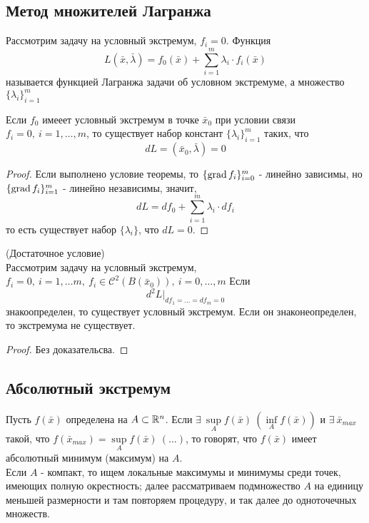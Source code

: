 \subsection{Метод множителей Лагранжа}
\begin{definition}
    Рассмотрим задачу на условный экстремум, $f_i=0$. Функция 
    \[L(\bar{x},\bar{\lambda})=f_0(\bar{x})+\sum\limits_{i=1}^{m}\lambda_i\cdot f_i(\bar{x})\]
    называется функцией Лагранжа задачи об условном экстремуме, а множество $\{\lambda_i\}_{i=1}^m$
\end{definition} 
\begin{theorem}
    Если $f_0$ имееет условный экстремум в точке $\bar{x}_0$ при условии связи $f_i=0,\ i=1,\dots,m$, то существует набор констант $\{\lambda_i\}_{i=1}^m$ таких, что 
    \[dL=(\bar{x}_0,\bar{\lambda})=0\]
\end{theorem} 
\begin{proof}
    Если выполнено условие теоремы, то $\{\operatorname*{grad} f_i\}_{i=0}^m$ - линейно зависимы, но $\{\operatorname*{grad} f_i\}_{i=1}^m$ - линейно независимы, значит,
    \[dL=df_0+\sum\limits_{i=1}^{m}\lambda_i\cdot df_i\]
    то есть существует набор $\{\lambda_i\}$, что $dL=0$. 
\end{proof} 
\begin{theorem} (Достаточное условие)\\
    Рассмотрим задачу на условный экстремум, $f_i=0,\ i=1,\dots m,\ f_i\in \mathcal{C}^2(B(\bar{x}_0)),\ i=0,\dots,m$ Если
    \[d^2L|_{df_1=\dots=df_m=0}\]
    знакоопределен, то существует условный экстремум. Если он знаконеопределен, то экстремума не существует.
\end{theorem} 
\begin{proof}
    Без доказательсва.
\end{proof} 
\subsection{Абсолютный экстремум}
\begin{definition}
    Пусть $f(\bar{x})$ определена на $A\subset \mathbb{R}^n$. Если $\exists\ \sup\limits_A f(\bar{x})\ (\inf\limits_A f(\bar{x}))$ и $\exists\ \bar{x}_{max}$ такой, что $f(\bar{x}_{max})=\sup\limits_A f(\bar{x})\ (\dots)$, то говорят, что $f(\bar{x})$ имеет абсолютный минимум (максимум) на $A$.
    \\ Если $A$ - компакт, то ищем локальные максимумы и минимумы среди точек, имеющих полную окрестность; далее рассматриваем подмножество $A$ на единицу меньшей размерности и там повторяем процедуру, и так далее до одноточечных множеств.
\end{definition} 
